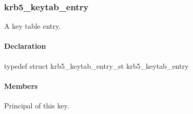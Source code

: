\documentclass[letterpaper,10pt,english]{sphinxmanual}
\begin{document}
\begin{fulllineitems}
\label{appdev/refs/types/krb5_keyblock:c.krb5_keyblock.contents}
\end{fulllineitems}



\subsubsection{krb5\_keytab\_entry}
\label{appdev/refs/types/krb5_keytab_entry:krb5-keytab-entry}\label{appdev/refs/types/krb5_keytab_entry:krb5-keytab-entry-struct}\label{appdev/refs/types/krb5_keytab_entry::doc}

\begin{fulllineitems}
\label{appdev/refs/types/krb5_keytab_entry:c.krb5_keytab_entry}
\end{fulllineitems}


A key table entry.


\paragraph{Declaration}
\label{appdev/refs/types/krb5_keytab_entry:declaration}
typedef struct krb5\_keytab\_entry\_st  krb5\_keytab\_entry


\paragraph{Members}
\label{appdev/refs/types/krb5_keytab_entry:members}

\begin{fulllineitems}
\label{appdev/refs/types/krb5_keytab_entry:c.krb5_keytab_entry.magic}
\end{fulllineitems}


\begin{fulllineitems}
\label{appdev/refs/types/krb5_keytab_entry:c.krb5_keytab_entry.principal}
Principal of this key.

\end{fulllineitems}
\end{document}
